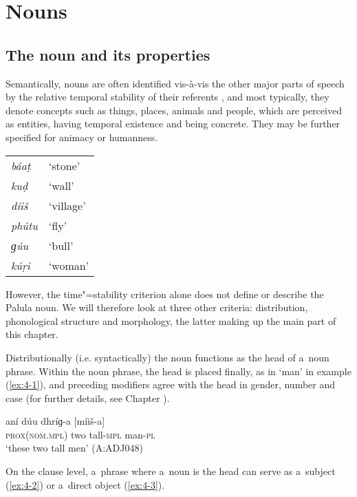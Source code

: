 \chapter{Nouns}
\label{chap:4}

\section{The noun and its properties}
\label{sec:4-1}


Semantically, nouns are often identified vis-à-vis the other major parts of speech by the relative
temporal stability of their referents \citep[51]{givon2001a}, and most typically, they denote concepts
such as things, places, animals and people, which are perceived as entities, having temporal
existence and being concrete. They may be further specified for animacy or humanness.

\begin{table}[H]
\begin{tabular}{ l l }
\textit{báaṭ} &
`stone'\\
\textit{kuḍ} &
`wall'\\
\textit{díiš} &
`village'\\
\textit{phútu} &
`fly'\\
\textit{ɡúu} &
`bull'\\
\textit{kúṛi} &
`woman'\\
\end{tabular}
\end{table}

However, the time"=stability criterion alone does not define or describe the Palula noun. We will therefore look at three other criteria: distribution, phonological structure and morphology, the latter making up the main part of this chapter. 


Distributionally (i.e. syntactically) the noun functions as the head of a~noun phrase. Within the noun phrase, the head is placed finally, as in `man' in example (\ref{ex:4-1}), and preceding modifiers agree with the head in gender, number and case (for further details, see Chapter ).


\begin{exe}
\ex
\label{ex:4-1}
\gll aní dúu dhríɡ-a [míiš-a] \\
	\textsc{prox(nom.mpl)} two tall-\textsc{mpl} man-\textsc{pl} \\
\glt `these two tall men' (A:ADJ048)
\end{exe}

On the clause level, a~phrase where a~noun is the head can serve as a~subject (\ref{ex:4-2}) or a~direct object (\ref{ex:4-3}).

